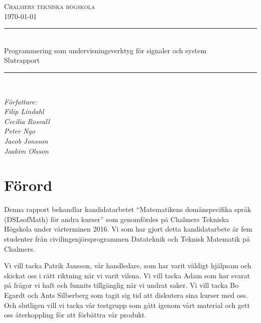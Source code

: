 \documentclass[]{article}
\date{\today}
\begin{document}
\begin{titlepage} \newcommand{\HRule}{\rule{\linewidth}{0.3mm}}
  \center
  \textsc{\Large Chalmers tekniska högskola}\\[0.05cm]
  \normalsize \today

  \HRule \\[0.08cm]
  { \large Programmering som undervisningsverktyg för signaler och system
    \\
    \normalsize{Slutrapport}
  } \\[0.08cm] %
  \HRule \\[0.3cm]

  \vfill

  \begin{flushleft}
    \small
    \emph{Författare: \\
      \quad Filip Lindahl\\
      \quad Cecilia Rosvall\\
      \quad Peter Ngo\\
      \quad Jacob Jonsson\\
      \quad Joakim Olsson\\}
  \end{flushleft}
\end{titlepage}
\newpage

\section*{Förord}
Denna rapport behandlar kandidatarbetet “Matematikens domänspecifika språk (DSLsofMath) för andra kurser” som 
genomfördes på Chalmers Tekniska Högskola under vårterminen 2016. Vi som har gjort detta kandidatarbete är fem studenter 
från civilingenjörsprogrammen Datateknik och Teknisk Matematik på Chalmers. 

Vi vill tacka Patrik Jansson, vår handledare, som har varit väldigt hjälpsam och skickat oss i rätt riktning när vi 
varit vilsna. Vi vill tacka Adam som har svarat på frågor vi haft och funnits tillgänglig när vi undrat saker. Vi vill 
tacka Bo Egardt och Ants Silberberg som tagit sig tid att diskutera sina kurser med oss. Och slutligen vill vi tacka vår 
testgrupp som gått igenom vårt material och gett oss återkoppling för att förbättra vår produkt.
\end{document}
